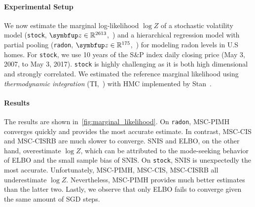 \paragraph{Experimental Setup}
We now estimate the marginal log-likelihood \(\log Z\) of a stochastic volatility model (\texttt{stock}, \(\vz \in \mathbb{R}^{2613}\),~\citealt{kim_stochastic_1998}) and a hierarchical regression model with partial pooling (\texttt{radon}, \(\vz \in \mathbb{R}^{175}\),~\citealt{gelman_data_2007}) for modeling radon levels in U.S homes.
For \texttt{stock}, we use 10 years of the S\&P index daily closing price (May 3, 2007, to May 3, 2017).
\texttt{stock} is highly challenging as it is both high dimensional and strongly correlated.
We estimated the reference marginal likelihood using \textit{thermodynamic integration} (TI,~\citealt{gelman_simulating_1998, neal_annealed_2001, lartillot_computing_2006}) with HMC implemented by Stan~\citep{carpenter_stan_2017, betancourt_conceptual_2017}.

\vspace{-0.10in}
\paragraph{Results}
The results are shown in~\cref{fig:marginal_likelihood}.
On \texttt{radon}, MSC-PIMH converges quickly and provides the most accurate estimate.
In contrast, MSC-CIS and MSC-CISRB are much slower to converge.
SNIS and ELBO, on the other hand, overestimate \(\log Z\), which can be attributed to the mode-seeking behavior of ELBO and the small sample bias of SNIS.
On \texttt{stock}, SNIS is unexpectedly the most accurate.
Unfortunately, MSC-PIMH, MSC-CIS, MSC-CISRB all underestimate \(\log Z\).
Nevertheless, MSC-PIMH provides much better estimates than the latter two.
Lastly, we observe that only ELBO fails to converge given the same amount of SGD steps.

